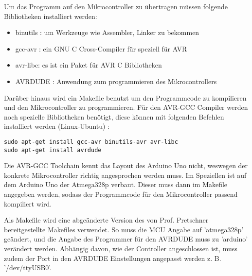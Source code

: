 Um das Programm auf den Mikrocontroller zu übertragen müssen folgende Bibliotheken installiert werden: 

\begin{itemize}
    \item binutils : um Werkzeuge wie Assembler, Linker zu bekommen
    \item gcc-avr : ein GNU C Cross-Compiler für speziell für AVR
    \item avr-libc: es ist ein Paket für AVR C Bibliotheken
    \item AVRDUDE : Anwendung zum programmieren des Mikrocontrollers
\end{itemize}

Darüber hinaus wird ein Makefile benutzt um den Programmcode zu kompilieren und den Mikrocontroller zu programmieren. Für den AVR-GCC Compiler werden noch spezielle Bibliotheken benötigt, diese können mit folgenden Befehlen installiert werden (Linux-Ubuntu) \cite{online:avrboard}:

\begin{lstlisting}[style=CStyle]
sudo apt-get install gcc-avr binutils-avr avr-libc
sudo apt-get install avrdude
\end{lstlisting}

Die AVR-GCC Toolchain kennt das Layout des Arduino Uno nicht, weswegen der konkrete Mikrocontroller richtig angesprochen werden muss. Im Speziellen ist auf dem Arduino Uno der Atmega328p verbaut. Dieser muss dann im Makefile angegeben werden, sodass der Programmcode für den Mikrocontroller passend kompiliert wird. 

Als Makefile wird eine abgeänderte Version des von Prof. Pretschner bereitgestellte Makefiles verwendet. So muss die MCU Angabe auf 'atmega328p' geändert, und die Angabe des Programmer für den AVRDUDE muss zu 'arduino' verändert werden. Abhängig davon, wie der Controller angeschlossen ist, muss zudem der Port in den AVRDUDE Einstellungen angepasst werden z. B. '/dev/ttyUSB0'.

